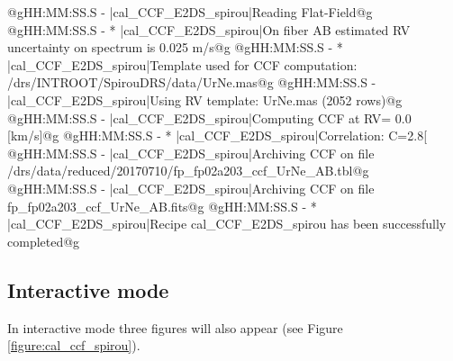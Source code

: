 \begin{cmdboxprintspecial}[fontupper=\tiny, fontlower=\tiny]
@gHH:MM:SS.S -   |cal_CCF_E2DS_spirou|Reading Flat-Field@g
@gHH:MM:SS.S - * |cal_CCF_E2DS_spirou|On fiber AB estimated RV uncertainty on spectrum is 0.025 m/s@g
@gHH:MM:SS.S - * |cal_CCF_E2DS_spirou|Template used for CCF computation: /drs/INTROOT/SpirouDRS/data/UrNe.mas@g
@gHH:MM:SS.S -   |cal_CCF_E2DS_spirou|Using RV template: UrNe.mas (2052 rows)@g
@gHH:MM:SS.S -   |cal_CCF_E2DS_spirou|Computing CCF at RV=    0.0 [km/s]@g
@gHH:MM:SS.S - * |cal_CCF_E2DS_spirou|Correlation: C=2.8[%
@gHH:MM:SS.S -   |cal_CCF_E2DS_spirou|Archiving CCF on file /drs/data/reduced/20170710/fp_fp02a203_ccf_UrNe_AB.tbl@g
@gHH:MM:SS.S -   |cal_CCF_E2DS_spirou|Archiving CCF on file fp_fp02a203_ccf_UrNe_AB.fits@g
@gHH:MM:SS.S - * |cal_CCF_E2DS_spirou|Recipe cal_CCF_E2DS_spirou has been successfully completed@g
\end{cmdboxprintspecial}


\newpage
\subsection{Interactive mode}

\noindent In interactive mode three figures will also appear (see Figure \ref{figure:cal_ccf_spirou}).

